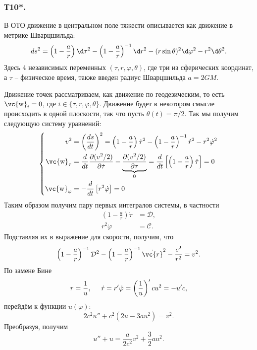 \subsubsection*{Т10*.}

В ОТО движение в центральном поле тяжести описывается как движение в метрике Шварцшильда:
$$
    d s^2 = \left(1 - \frac{a}{r} \right) \d \tau^2
    -
    \left(1 - \frac{a}{r} \right)^{-1} \d r^2
    -
    (r \sin \theta)^2 \d \varphi^2 - r^2 \d \theta^2.
$$
Здесь 4 независимых переменных $(\tau, r,  \varphi, \theta)$, где три из сферических координат, а $\tau$ -- физическое время,
также введен радиус Шварцшильда $a = 2 GM$.

Движение точек рассматриваем, как движение по геодезическим, то есть $\vc{\mathrm{w}}_i = 0$, где $i \in \{\tau, r, \varphi, \theta\}$. Движение будет в некотором смысле происходить в одной плоскости, так что пусть $\theta (t) = \pi / 2$. Так мы получим следующую систему уравнений:
\begin{equation}
    \left\{
        \begin{aligned}
            v^2 &= 
            \left(
            \frac{ds}{dt} \right)^2 = \left(1 - \frac{a}{r} \right) \dot{\tau}^2
            - \left(1 - \frac{a}{r} \right)^{-1} \dot{r}^2 - r^2 \dot{\varphi}^2 \\
            \vc{\mathrm{w}}_\tau &=
            \frac{d}{dt} \frac{\partial (v^2/2)}{\partial \dot{\tau}} -
            \underbrace{\frac{\partial (v^2/2)}{\partial \tau}}_{0} =
            \frac{d}{dt} \left[\left(
                       1 -  \frac{a}{r} 
                    \right) \dot{\tau}\right] = 0 \\
            \vc{\mathrm{w}}_\varphi &= 
            - \frac{d}{dt} \left[
                r^2 \dot{\varphi}
            \right] = 0
        \end{aligned}
    \right.
\end{equation}
Таким образом получим пару первых интегралов системы, в частности
\begin{align*}
    \left(1 - \frac{a}{r} \right) \dot{\tau} &= \mathcal D,
    \\ r^2 \dot{\varphi} &= \mathcal C.
\end{align*}
Подставляя их в выражение для скорости, получим, что
\begin{equation*}
\left(
1 - \frac{a}{r} 
\right)^{-1} \mathcal D^2 -
\left(1 - \frac{a}{r} \right)^{-1} \dot{\vc{r}}^2 - \frac{c^2}{r^2}  = v^2.
\end{equation*}
По замене Бине 
$$
    r = \frac{1}{u}, \hspace{0.5cm} 
    \dot{r} = r' \dot{\varphi} = \left(\frac{1}{u} \right)' c u^2 =
    - u' c,
$$
перейдём к функции $u(\varphi)$:
\begin{equation}
    2 c^2 u'' + c^2 (2u - 3 au^2) = v^2.
\end{equation}
Преобразуя, получим
\begin{equation}
\boxed{
    u'' + u = \frac{a}{2c^2} v^2 + \frac{3}{2} au^2
}.
\end{equation}



